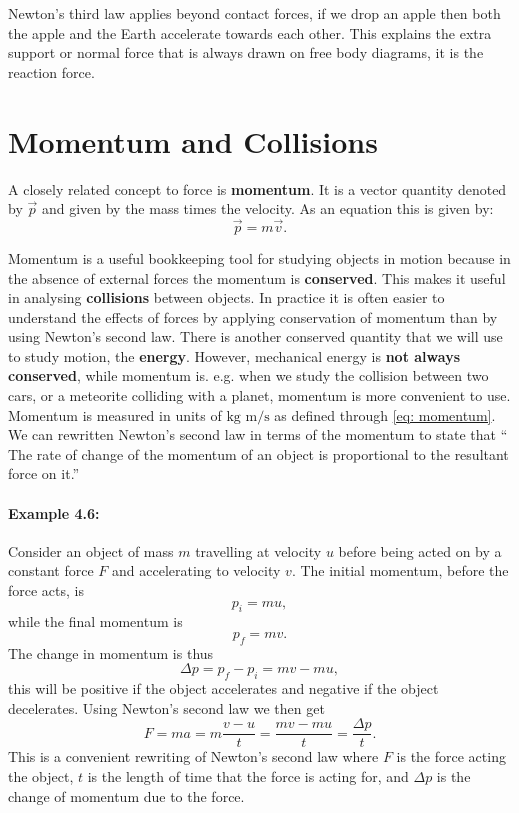 Newton's third law applies beyond contact forces, if we drop an apple then both the apple and the Earth accelerate towards each other. This explains the extra support or normal force that is always drawn on free body diagrams, it is the reaction force.\\


\section{Momentum and Collisions}
A closely related concept to force is \textbf{momentum}. It is a vector quantity denoted by $\vec{p}$ and given by the mass times the velocity. As an equation this is given by:
\begin{equation*}
\vec{p}=m\vec{v}.
\label{eq: momentum}
\end{equation*}

Momentum is a useful bookkeeping tool for studying objects in motion because in the absence of external forces the momentum is \textbf{conserved}. This makes it useful in analysing \textbf{collisions} between objects. In practice it is often easier to understand the effects of forces by applying conservation of momentum than by using Newton's second law. There is another conserved quantity that we will use to study motion, the \textbf{energy}. However, mechanical energy is \textbf{not always conserved}, while momentum is. e.g. when we study the collision between two cars, or a meteorite colliding with a planet, momentum is more convenient to use.\\

Momentum is measured in units of $\text{kg m/s}$ as defined through \cref{eq: momentum}.  We can rewritten Newton's second law in terms of the momentum to state that `` The rate of change of the momentum of an object is proportional to the resultant force on it.''

\paragraph{Example 4.6:} Consider an object of mass $m$ travelling at velocity $u$ before being acted on by a constant force $F$ and accelerating to velocity $v$. The initial momentum, before the force acts, is
\begin{equation*}
p_{i}=mu,
\end{equation*}
while the final momentum is 
\begin{equation*}
p_{f}=mv.
\end{equation*}
The change in momentum is thus
\begin{equation*}
\Delta p=p_{f}-p_{i}=mv-mu,
\end{equation*}
this will be positive if the object accelerates and negative if the object decelerates. Using Newton's second law we then get
\begin{equation*}
F=ma=m\frac{v-u}{t}=\frac{mv-mu}{t}=\frac{\Delta p}{t}.
\end{equation*}
This is a convenient rewriting of Newton's second law where $F$ is the force acting the object, $t$ is the length of time that the force is acting for, and $\Delta p$ is the change of momentum due to the force.

